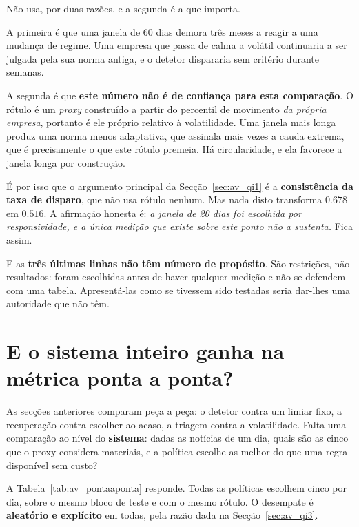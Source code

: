 Não usa, por duas razões, e a segunda é a que importa.

A primeira é que uma janela de 60 dias demora três meses a reagir a uma mudança de regime. Uma
empresa que passa de calma a volátil continuaria a ser julgada pela sua norma antiga, e o detetor
dispararia sem critério durante semanas.

A segunda é que \textbf{este número não é de confiança para esta comparação}. O rótulo é um
\emph{proxy} construído a partir do percentil de movimento \emph{da própria empresa}, portanto é ele
próprio relativo à volatilidade. Uma janela mais longa produz uma norma menos adaptativa, que
assinala mais vezes a cauda extrema, que é precisamente o que este rótulo premeia. Há circularidade,
e ela favorece a janela longa por construção.

É por isso que o argumento principal da Secção~\ref{sec:av_qi1} é a \textbf{consistência da taxa de
disparo}, que não usa rótulo nenhum. Mas nada disto transforma $0.678$ em $0.516$. A afirmação
honesta é: \emph{a janela de 20 dias foi escolhida por responsividade, e a única medição que
existe sobre este ponto não a sustenta.} Fica assim.

E as \textbf{três últimas linhas não têm número de propósito}. São restrições, não resultados: foram
escolhidas antes de haver qualquer medição e não se defendem com uma tabela. Apresentá-las como se
tivessem sido testadas seria dar-lhes uma autoridade que não têm.

\section{E o sistema inteiro ganha na métrica ponta a ponta?}
\label{sec:av_pontaaponta}

As secções anteriores comparam peça a peça: o detetor contra um limiar fixo, a recuperação contra
escolher ao acaso, a triagem contra a volatilidade. Falta uma comparação ao nível do
\textbf{sistema}: dadas as notícias de um dia, quais são as cinco que o proxy considera materiais,
e a política escolhe-as melhor do que uma regra disponível sem custo?

A Tabela~\ref{tab:av_pontaaponta} responde. Todas as políticas escolhem cinco por dia, sobre o
mesmo bloco de teste e com o mesmo rótulo. O desempate é \textbf{aleatório e explícito} em todas,
pela razão dada na Secção~\ref{sec:av_qi3}.

